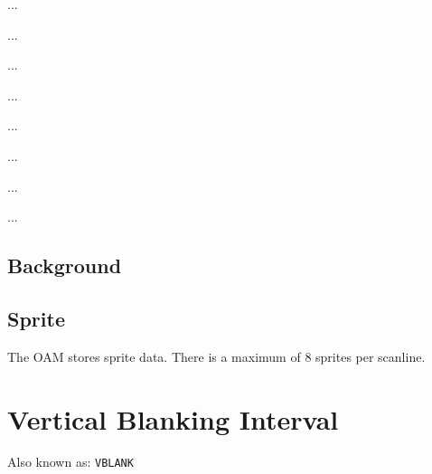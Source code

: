  ... 

 ... 

 ... 

 ... 

 ... 

 ... 

 ... 

 ... 

\subsection{Background}

\subsection{Sprite}

The OAM stores sprite data.
There is a maximum of 8 sprites per scanline.

\section{Vertical Blanking Interval}

Also known as: \texttt{VBLANK}
